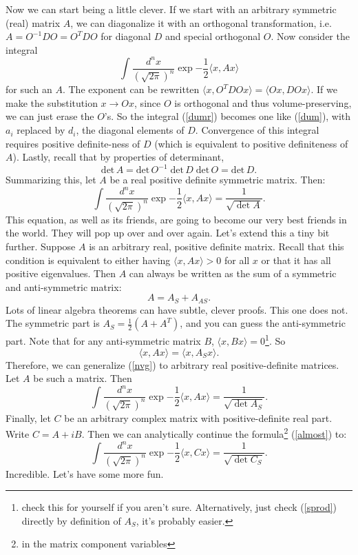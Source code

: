 \documentclass[main.tex]{subfiles}
\begin{document}
Now we can start being a little clever. If we start with an arbitrary symmetric (real) matrix $A$, we can diagonalize it with an orthogonal transformation, i.e. $A = O^{-1} D O = O^T D O$ for diagonal $D$ and special orthogonal $O$. Now consider the integral
\begin{equation} \label{dumr}
\int \frac{d^n x}{(\sqrt{2 \pi})^n} \exp{-\frac{1}{2} \langle x, A x \rangle}
\end{equation}
for such an $A$. The exponent can be rewritten $\langle x, O^T D O x \rangle = \langle Ox, D Ox \rangle$. If we make the substitution $x \to Ox$, since $O$ is orthogonal and thus volume-preserving, we can just erase the $O$'s. So the integral (\ref{dumr}) becomes one like (\ref{dum}), with $a_i$ replaced by $d_i$, the diagonal elements of $D$. Convergence of this integral requires positive definite-ness of $D$ (which is equivalent to positive definiteness of $A$). Lastly, recall that by properties of determinant, 
\[
\text{det} \, A = \text{det} \, O^{-1} \; \text{det} \, D \; \text{det} \, O = \text{det} \, D.
\]
Summarizing this, let $A$ be a real positive definite symmetric matrix. Then:
\begin{equation} \label{nvg}
\boxed{\int \frac{d^n x}{(\sqrt{2 \pi})^n} \exp{-\frac{1}{2} \langle x, A x \rangle} = \frac{1}{\sqrt{\det A}}.}
\end{equation}
This equation, as well as its friends, are going to become our very best friends in the world. They will pop up over and over again. Let's extend this a tiny bit further. Suppose $A$ is an arbitrary real, positive definite matrix. Recall that this condition is equivalent to either having $\langle x, A x \rangle > 0$ for all $x$ or that it has all positive eigenvalues. Then $A$ can always be written as the sum of a symmetric and anti-symmetric matrix:
\[
A = A_S + A_{AS}.
\]
Lots of linear algebra theorems can have subtle, clever proofs. This one does not. The symmetric part is $A_S = \frac{1}{2}\left(A + A^T \right)$, and you can guess the anti-symmetric part. Note that for any anti-symmetric matrix $B$, $\langle x, B x \rangle = 0$\footnote{check this for yourself if you aren't sure. Alternatively, just check (\ref{sprod}) directly by definition of $A_S$, it's probably easier.}. So 
\begin{equation} \label{sprod}
\langle x, A x \rangle = \langle x, A_S x \rangle.
\end{equation}
Therefore, we can generalize (\ref{nvg}) to arbitrary real positive-definite matrices. Let $A$ be such a matrix. Then
\begin{equation} \label{almost}
\int \frac{d^n x}{(\sqrt{2 \pi})^n} \exp{-\frac{1}{2} \langle x, A x \rangle} = \frac{1}{\sqrt{\det A_S}}.
\end{equation}
Finally, let $C$ be an arbitrary complex matrix with positive-definite real part. Write $C = A + i B$. Then we can analytically continue the formula\footnote{in the matrix component variables} (\ref{almost}) to:
\begin{equation} \label{nvgf}
\boxed{\int \frac{d^n x}{(\sqrt{2 \pi})^n} \exp{-\frac{1}{2} \langle x, C x \rangle} = \frac{1}{\sqrt{\det C_S}}.}
\end{equation}
Incredible. Let's have some more fun.
\end{document}
